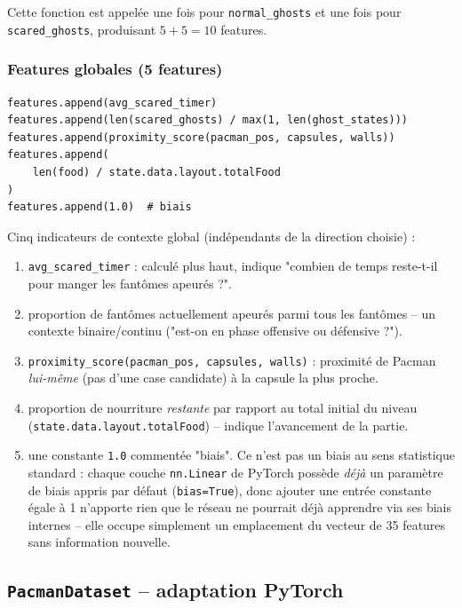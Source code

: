 \documentclass[a4paper,12pt]{article}
\begin{document}
Cette fonction est appelée une fois pour \texttt{normal\_ghosts} et une
fois pour \texttt{scared\_ghosts}, produisant $5 + 5 = 10$ features.

\subsubsection{Features globales (5 features)}

\begin{lstlisting}
features.append(avg_scared_timer)
features.append(len(scared_ghosts) / max(1, len(ghost_states)))
features.append(proximity_score(pacman_pos, capsules, walls))
features.append(
    len(food) / state.data.layout.totalFood
)
features.append(1.0)  # biais
\end{lstlisting}

Cinq indicateurs de contexte global (indépendants de la direction
choisie) :
\begin{enumerate}
    \item \texttt{avg\_scared\_timer} : calculé plus haut, indique
    "combien de temps reste-t-il pour manger les fantômes apeurés ?".
    \item proportion de fantômes actuellement apeurés parmi tous les
    fantômes -- un contexte binaire/continu ("est-on en phase offensive
    ou défensive ?").
    \item \texttt{proximity\_score(pacman\_pos, capsules, walls)} :
    proximité de Pacman \emph{lui-même} (pas d'une case candidate) à la
    capsule la plus proche.
    \item proportion de nourriture \emph{restante} par rapport au total
    initial du niveau (\texttt{state.data.layout.totalFood}) -- indique
    l'avancement de la partie.
    \item une constante \texttt{1.0} commentée "biais". Ce n'est pas un
    biais au sens statistique standard : chaque couche \texttt{nn.Linear}
    de PyTorch possède \emph{déjà} un paramètre de biais appris par
    défaut (\texttt{bias=True}), donc ajouter une entrée constante égale
    à 1 n'apporte rien que le réseau ne pourrait déjà apprendre via ses
    biais internes -- elle occupe simplement un emplacement du vecteur de
    35 features sans information nouvelle.
\end{enumerate}

\subsection{\texttt{PacmanDataset} -- adaptation PyTorch}
\end{document}
